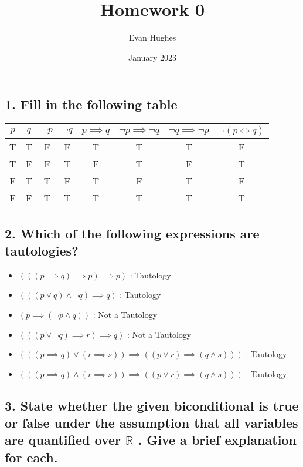 \documentclass{article}
\title{Homework 0}
\author{Evan Hughes}
\date{January 2023}
\begin{document}
\maketitle

\subsection*{1. Fill in the following table}
\begin{tabular}{||c c c c c c c c||}
    $p$ & $q$ & $\lnot p$ & $\lnot q$ & $p \implies q$ & $\lnot p \implies \lnot q$ & $\lnot q \implies \lnot p$ & $\lnot ( p \Longleftrightarrow  q) $ \\
    \hline
    T & T & F & F & T & T & T & F \\
    T & F & F & T & F & T & F & T \\
    F & T & T & F & T & F & T & F \\
    F & F & T & T & T & T & T & T \\

\end{tabular}

\subsection*{2. Which of the following expressions are tautologies?}

\begin{itemize}
    \item $( ( ( p \implies q) \implies p) \implies p) $ : Tautology
    \item $( ( ( p \lor  q) \land \lnot q ) \implies q)$ : Tautology
    \item $( p \implies ( \lnot p \land q ) ) $ : Not a Tautology
    \item $( ( ( p \lor \lnot q) \implies r) \implies q)$ : Not a Tautology
    \item $( ( ( p \implies q) \lor ( r \implies s ) ) \implies ( ( p \lor r ) \implies ( q \land s) ) ) $ : Tautology
    \item $( ( ( p \implies q) \land ( r \implies s ) ) \implies ( ( p \lor r ) \implies ( q \land s) ) ) $ : Tautology
\end{itemize}

\subsection*{3. State whether the given biconditional is true or false under the assumption that all variables
are quantified over $\mathbb{R}$ . Give a brief explanation for each.}
\end{document}
